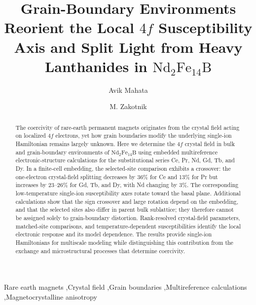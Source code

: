 \documentclass[final,1p,times]{elsarticle}
\DeclareRobustCommand{\rev}[1]{{\color{revcolor}#1}}
\newcommand{\ndfeb}{\mathrm{Nd_2Fe_{14}B}}
\begin{document}
\begin{frontmatter}

\title{\rev{Grain-Boundary Environments Reorient the Local $4f$ Susceptibility Axis and Split Light from Heavy Lanthanides in $\ndfeb$}}

\author[mc]{Avik Mahata}
\author[nv]{M. Zakotnik}

\address[mc]{Department of Mechanical and Electrical Engineering, Merrimack College, North Andover, MA, USA}
\address[nv]{Mendelan LLC, Hudson, OH, USA}

\begin{abstract}
The coercivity of rare-earth permanent magnets originates from the crystal field acting on localized $4f$ electrons, yet how grain boundaries modify the underlying single-ion Hamiltonian remains largely unknown. Here we determine the $4f$ crystal field in bulk and grain-boundary environments of $\ndfeb$ using embedded multireference electronic-structure calculations for the substitutional series Ce, Pr, Nd, Gd, Tb, and Dy. \rev{In a finite-cell embedding, the selected-site comparison exhibits a crossover: the one-electron crystal-field splitting decreases by 36\% for Ce and 13\% for Pr but increases by 23--26\% for Gd, Tb, and Dy, with Nd changing by 3\%.} \rev{The corresponding low-temperature single-ion susceptibility axes rotate toward the basal plane.} \rev{Additional calculations show that the sign crossover and large rotation depend on the embedding, and that the selected sites also differ in parent bulk sublattice; they therefore cannot be assigned solely to grain-boundary distortion.} \rev{Rank-resolved crystal-field parameters, matched-site comparisons, and temperature-dependent susceptibilities identify the local electronic response and its model dependence.} \rev{The results provide single-ion Hamiltonians for multiscale modeling while distinguishing this contribution from the exchange and microstructural processes that determine coercivity.}
\end{abstract}

\begin{keyword}
Rare earth magnets \sep Crystal field \sep Grain boundaries \sep Multireference calculations \sep Magnetocrystalline anisotropy
\end{keyword}

\end{frontmatter}
\end{document}
